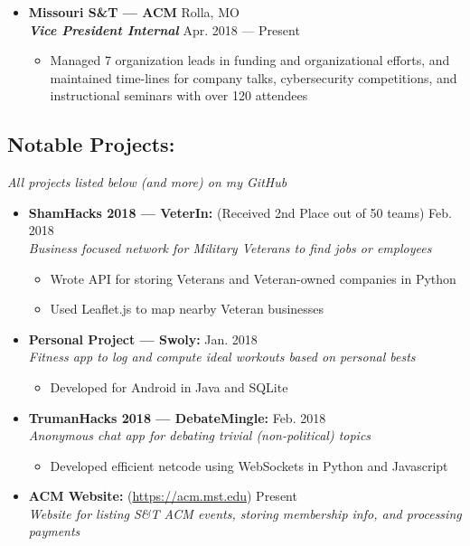 \documentclass[9pt,oneside]{memoir}
\begin{document}
\begin{itemize}
  \item[] \textbf{Missouri S\&T --- ACM}
      \hfill Rolla, MO\\
      \textit{\textbf{Vice President Internal}}
      \hfill Apr. 2018 --- Present
      \begin{itemize}
          \item[\textbullet] Managed 7 organization leads in funding and
          organizational efforts, and maintained time-lines for company talks,
          cybersecurity competitions, and instructional seminars with over 120
          attendees
      \end{itemize}
\end{itemize}

\vspace*{-11px}
\subsection*{Notable Projects:}
\vspace*{-4px}
\textit{All projects listed below (and more) on my GitHub}
\begin{itemize}

  \item[] \textbf{ShamHacks 2018 --- VeterIn:} (Received 2nd Place out of 50 teams)
    \hfill Feb. 2018\\
    \textit{Business focused network for Military Veterans to find jobs or employees}
    \begin{itemize}
      \item[\textbullet] Wrote API for storing Veterans and Veteran-owned companies in Python
      \item[\textbullet] Used Leaflet.js to map nearby Veteran businesses
    \end{itemize}

  \item[] \textbf{Personal Project --- Swoly:}
    \hfill Jan. 2018\\
    \textit{Fitness app to log and compute ideal workouts based on personal bests}
    \begin{itemize}
      \item[\textbullet] Developed for Android in Java and SQLite
    \end{itemize}

  \item[] \textbf{TrumanHacks 2018 --- DebateMingle:}
    \hfill Feb. 2018\\
    \textit{Anonymous chat app for debating trivial (non-political) topics}
    \begin{itemize}
      \item[\textbullet] Developed efficient netcode using WebSockets in Python and Javascript
    \end{itemize}

    \item[] \textbf{ACM Website:} (\url{https://acm.mst.edu})
    \hfill Present\\
    \textit{Website for listing S\&T ACM events, storing membership info, and processing payments}
  \end{itemize}
  
\end{document}
